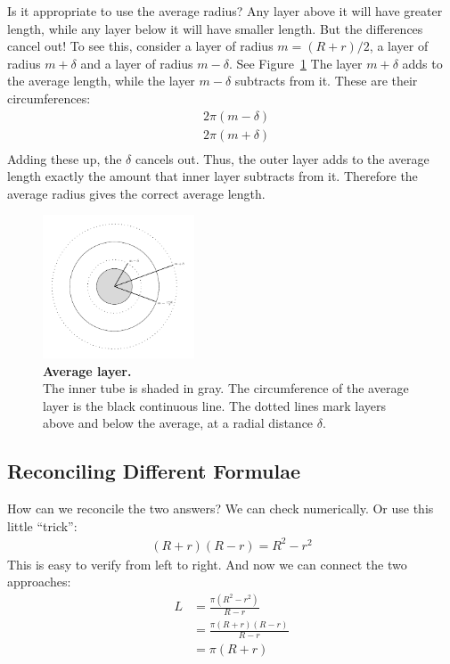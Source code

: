 \documentclass[12pt, a4]{article}
\begin{document}
Is it appropriate to use the average radius? Any layer above it will have greater length, while any layer below it will have smaller length. But the differences cancel out! To see this, consider a layer of radius $m=(R+r)/2$, a layer of radius $m+\delta$ and a layer of radius $m-\delta$. See Figure~\ref{fig:annulus:03} The layer $m+\delta$ adds to the average length, while the layer $m-\delta$ subtracts from it. These are their circumferences:
\begin{align*}
& 2 \pi (m-\delta) \\
& 2 \pi (m+\delta) \\
\end{align*}
Adding these up, the $\delta$ cancels out. Thus, the outer layer adds to the average length exactly the amount that inner layer subtracts from it. Therefore the average radius gives the correct average length. 

\begin{figure}[hpbt]
\begin{minipage}[b]{\textwidth}
\centering
\includegraphics[width=0.4\textwidth]
{annulus_tikz_3b}
\caption{\textbf{Average layer.} \\
The inner tube is shaded in gray. The circumference of the average layer is the black continuous line. The dotted lines mark layers above and below the average, at a radial distance $\delta$.
\label{fig:annulus:03}}
\end{minipage}
\end{figure}

\newpage 
\subsection*{Reconciling Different Formulae}
How can we reconcile the two answers? We can check numerically. Or use this little ``trick'':
\begin{align*}
(R+r)(R-r) = R^{2}-r^{2}
\end{align*}
This is easy to verify from left to right. And now we can connect the two approaches:
\begin{align*}
L & = \frac{\pi(R^{2}-r^{2})}{R-r} \\
  & = \frac{\pi(R+r)(R-r)}{R-r} \\
  & = \pi (R+r)
\end{align*}
\end{document}
